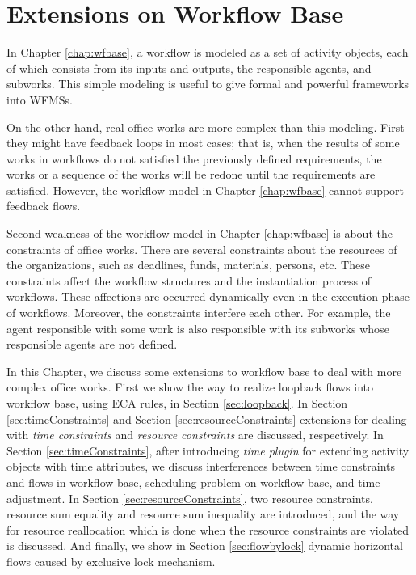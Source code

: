 
\chapter{Extensions on Workflow Base}
\label{chap:ext}


In Chapter \ref{chap:wfbase}, a workflow is modeled as a set of activity
objects, each of which consists from its inputs and outputs, the
responsible agents, and subworks.  This simple modeling is useful to
give formal and powerful frameworks into WFMSs.

On the other hand, real office works are more complex than this modeling.
First they might have feedback loops in most cases; that is, when the
results of some works in workflows do not satisfied the previously defined
requirements, the works or a sequence of the works will be redone until
the requirements are satisfied.  However, the workflow model in Chapter
\ref{chap:wfbase} cannot support feedback flows.

Second weakness of the workflow model in Chapter \ref{chap:wfbase} is
about the constraints of office works.  There are several constraints
about the resources of the organizations, such as deadlines, funds,
materials, persons, etc.  These constraints affect the workflow
structures and the instantiation process of workflows.  These affections
are occurred dynamically even in the execution phase of workflows.
Moreover, the constraints interfere each other.  For example, the agent
responsible with some work is also responsible with its subworks whose
responsible agents are not defined.

In this Chapter, we discuss some extensions to workflow base to deal
with more complex office works.  First we show the way to realize
loopback flows into workflow base, using ECA rules, in Section
\ref{sec:loopback}.  In Section \ref{sec:timeConstraints} and Section
\ref{sec:resourceConstraints} extensions for dealing with \emph{time
constraints} and \emph{resource constraints} are discussed,
respectively.  In Section \ref{sec:timeConstraints}, after introducing
\emph{time plugin} for extending activity objects with time attributes,
we discuss interferences between time constraints and flows in workflow
base, scheduling problem on workflow base, and time adjustment.  In
Section \ref{sec:resourceConstraints}, two resource constraints,
resource sum equality and resource sum inequality are introduced, and
the way for resource reallocation which is done when the resource
constraints are violated is discussed.  And finally, we show in Section
\ref{sec:flowbylock} dynamic horizontal flows caused by exclusive lock
mechanism.

